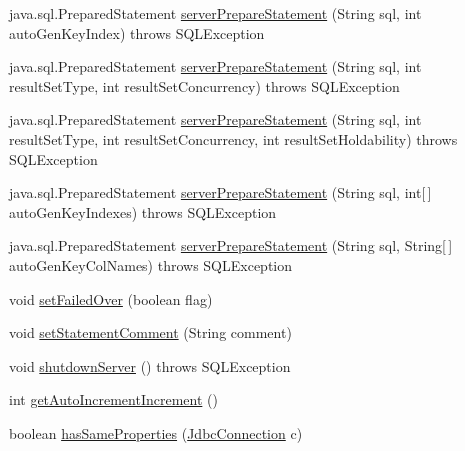\begin{DoxyCompactItemize}
\item 
java.\+sql.\+Prepared\+Statement \mbox{\hyperlink{interfacecom_1_1mysql_1_1cj_1_1jdbc_1_1_jdbc_connection_a9deb2cebf6538a53be5f24c52ee39f22}{server\+Prepare\+Statement}} (String sql, int auto\+Gen\+Key\+Index)  throws S\+Q\+L\+Exception
\item 
java.\+sql.\+Prepared\+Statement \mbox{\hyperlink{interfacecom_1_1mysql_1_1cj_1_1jdbc_1_1_jdbc_connection_aa0692efe53cb2eea133274bedbacd26a}{server\+Prepare\+Statement}} (String sql, int result\+Set\+Type, int result\+Set\+Concurrency)  throws S\+Q\+L\+Exception
\item 
java.\+sql.\+Prepared\+Statement \mbox{\hyperlink{interfacecom_1_1mysql_1_1cj_1_1jdbc_1_1_jdbc_connection_a0c300ea92f3c97874b104b5e999b440b}{server\+Prepare\+Statement}} (String sql, int result\+Set\+Type, int result\+Set\+Concurrency, int result\+Set\+Holdability)  throws S\+Q\+L\+Exception
\item 
java.\+sql.\+Prepared\+Statement \mbox{\hyperlink{interfacecom_1_1mysql_1_1cj_1_1jdbc_1_1_jdbc_connection_aefdad3d71436ba1c80d2cb1e8419dfba}{server\+Prepare\+Statement}} (String sql, int\mbox{[}$\,$\mbox{]} auto\+Gen\+Key\+Indexes)  throws S\+Q\+L\+Exception
\item 
java.\+sql.\+Prepared\+Statement \mbox{\hyperlink{interfacecom_1_1mysql_1_1cj_1_1jdbc_1_1_jdbc_connection_aa15ffc32d47d1950257c4720802694bf}{server\+Prepare\+Statement}} (String sql, String\mbox{[}$\,$\mbox{]} auto\+Gen\+Key\+Col\+Names)  throws S\+Q\+L\+Exception
\item 
void \mbox{\hyperlink{interfacecom_1_1mysql_1_1cj_1_1jdbc_1_1_jdbc_connection_a65cb0cc5d2afc54002bfc16222bbe402}{set\+Failed\+Over}} (boolean flag)
\item 
void \mbox{\hyperlink{interfacecom_1_1mysql_1_1cj_1_1jdbc_1_1_jdbc_connection_adfbd59fbebd013673ed3eb97beb76179}{set\+Statement\+Comment}} (String comment)
\item 
void \mbox{\hyperlink{interfacecom_1_1mysql_1_1cj_1_1jdbc_1_1_jdbc_connection_ad9bedf228ed2ec194197ac2ceb960a94}{shutdown\+Server}} ()  throws S\+Q\+L\+Exception
\item 
int \mbox{\hyperlink{interfacecom_1_1mysql_1_1cj_1_1jdbc_1_1_jdbc_connection_a06ded1274e682178c67fdb86f09fed5a}{get\+Auto\+Increment\+Increment}} ()
\item 
boolean \mbox{\hyperlink{interfacecom_1_1mysql_1_1cj_1_1jdbc_1_1_jdbc_connection_a10b46302ae879b80a889ad9cc22ee9ed}{has\+Same\+Properties}} (\mbox{\hyperlink{interfacecom_1_1mysql_1_1cj_1_1jdbc_1_1_jdbc_connection}{Jdbc\+Connection}} c)

\end{DoxyCompactItemize}
